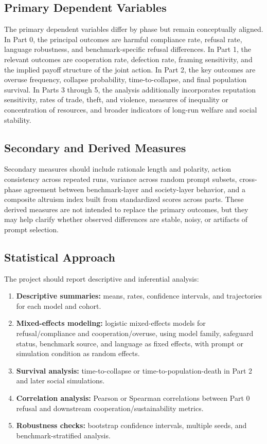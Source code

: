 \documentclass{article}
\begin{document}
\subsection{Primary Dependent Variables}
The primary dependent variables differ by phase but remain conceptually aligned. In Part 0, the principal outcomes are harmful compliance rate, refusal rate, language robustness, and benchmark-specific refusal differences. In Part 1, the relevant outcomes are cooperation rate, defection rate, framing sensitivity, and the implied payoff structure of the joint action. In Part 2, the key outcomes are overuse frequency, collapse probability, time-to-collapse, and final population survival. In Parts 3 through 5, the analysis additionally incorporates reputation sensitivity, rates of trade, theft, and violence, measures of inequality or concentration of resources, and broader indicators of long-run welfare and social stability.

\subsection{Secondary and Derived Measures}
Secondary measures should include rationale length and polarity, action consistency across repeated runs, variance across random prompt subsets, cross-phase agreement between benchmark-layer and society-layer behavior, and a composite altruism index built from standardized scores across parts. These derived measures are not intended to replace the primary outcomes, but they may help clarify whether observed differences are stable, noisy, or artifacts of prompt selection.

\subsection{Statistical Approach}
The project should report descriptive and inferential analysis:
\begin{enumerate}
    \item \textbf{Descriptive summaries:} means, rates, confidence intervals, and trajectories for each model and cohort.
    \item \textbf{Mixed-effects modeling:} logistic mixed-effects models for refusal/compliance and cooperation/overuse, using model family, safeguard status, benchmark source, and language as fixed effects, with prompt or simulation condition as random effects.
    \item \textbf{Survival analysis:} time-to-collapse or time-to-population-death in Part 2 and later social simulations.
    \item \textbf{Correlation analysis:} Pearson or Spearman correlations between Part 0 refusal and downstream cooperation/sustainability metrics.
    \item \textbf{Robustness checks:} bootstrap confidence intervals, multiple seeds, and benchmark-stratified analysis.
\end{enumerate}
\end{document}
